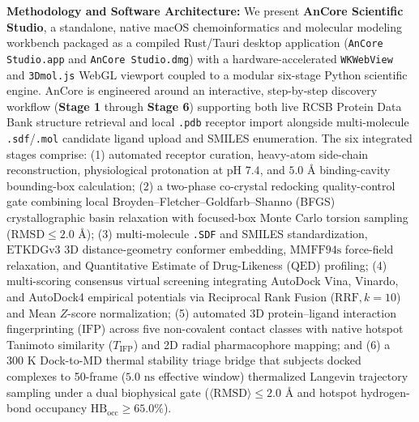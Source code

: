 \documentclass[11pt,a4paper]{article}
\begin{document}
\noindent\textbf{Methodology and Software Architecture:} We present \textbf{AnCore Scientific Studio}, a standalone, native macOS chemoinformatics and molecular modeling workbench packaged as a compiled Rust/Tauri desktop application (\texttt{AnCore Studio.app} and \texttt{AnCore Studio.dmg}) with a hardware-accelerated \texttt{WKWebView} and \texttt{3Dmol.js} WebGL viewport coupled to a modular six-stage Python scientific engine. AnCore is engineered around an interactive, step-by-step discovery workflow (\textbf{Stage 1} through \textbf{Stage 6}) supporting both live RCSB Protein Data Bank structure retrieval and local \texttt{.pdb} receptor import alongside multi-molecule \texttt{.sdf}/\texttt{.mol} candidate ligand upload and SMILES enumeration. The six integrated stages comprise: (1) automated receptor curation, heavy-atom side-chain reconstruction, physiological protonation at $\text{pH }7.4$, and $5.0\text{ \AA}$ binding-cavity bounding-box calculation; (2) a two-phase co-crystal redocking quality-control gate combining local Broyden--Fletcher--Goldfarb--Shanno (BFGS) crystallographic basin relaxation with focused-box Monte Carlo torsion sampling ($\text{RMSD} \le 2.0\text{ \AA}$); (3) multi-molecule \texttt{.SDF} and SMILES standardization, $\text{ETKDGv3}$ 3D distance-geometry conformer embedding, $\text{MMFF94s}$ force-field relaxation, and Quantitative Estimate of Drug-Likeness ($\text{QED}$) profiling; (4) multi-scoring consensus virtual screening integrating AutoDock Vina, Vinardo, and AutoDock4 empirical potentials via Reciprocal Rank Fusion ($\text{RRF}, k = 10$) and Mean $Z$-score normalization; (5) automated 3D protein--ligand interaction fingerprinting ($\text{IFP}$) across five non-covalent contact classes with native hotspot Tanimoto similarity ($T_{\text{IFP}}$) and 2D radial pharmacophore mapping; and (6) a $300\text{ K}$ Dock-to-MD thermal stability triage bridge that subjects docked complexes to 50-frame ($5.0\text{ ns}$ effective window) thermalized Langevin trajectory sampling under a dual biophysical gate ($\langle\text{RMSD}\rangle \le 2.0\text{ \AA}$ and hotspot hydrogen-bond occupancy $\text{HB}_{\text{occ}} \ge 65.0\%$).
\end{document}
